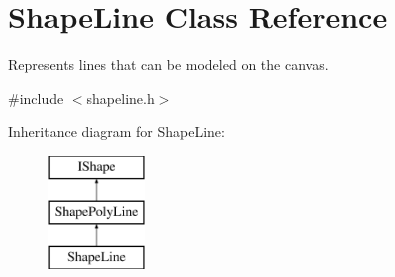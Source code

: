 \hypertarget{class_shape_line}{}\section{Shape\+Line Class Reference}
\label{class_shape_line}


Represents lines that can be modeled on the canvas.  




{\ttfamily \#include $<$shapeline.\+h$>$}

Inheritance diagram for Shape\+Line\+:\begin{figure}[H]
\begin{center}
\leavevmode
\includegraphics[height=3.000000cm]{class_shape_line}
\end{center}
\end{figure}
